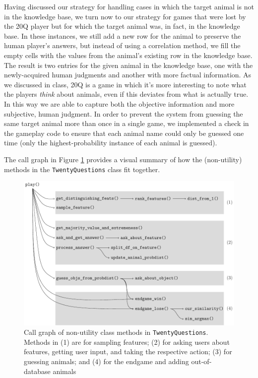 \documentclass[11pt,a4paper]{article}
\begin{document}
Having discussed our strategy for handling cases in which the target animal is not in the knowledge base, we turn now to our strategy for games that were lost by the 20Q player but for which the target animal was, in fact, in the knowledge base. 
In these instances, we still add a new row for the animal to preserve the human player's answers, but instead of using a correlation method, we fill the empty cells with the values from the animal's existing row in the knowledge base. 
The result is two entries for the given animal in the knowledge base, one with the newly-acquired human judgments and another with more factual information. 
As we discussed in class, 20Q is a game in which it's more interesting to note what the players \textit{think} about animals, even if this deviates from what is actually true. 
In this way we are able to capture both the objective information and more subjective, human judgment. 
In order to prevent the system from guessing the same target animal more than once in a single game, we implemented a check in the gameplay code to ensure that each animal name could only be guessed one time (only the highest-probability instance of each animal is guessed).  

\vspace{\baselineskip}

\noindent The call graph in Figure \ref{fig:call-graph} provides a visual summary of how the (non-utility) methods in the \texttt{TwentyQuestions} class fit together.

\begin{figure}
\centering
	\includegraphics[width=.9\linewidth]{graphics/call_graph.pdf}
	\caption{Call graph of non-utility class methods in \texttt{TwentyQuestions}. Methods in (1) are for sampling features; (2) for asking users about features, getting user input, and taking the respective action; (3) for guessing animals; and (4) for the endgame and adding out-of-database animals}
	\label{fig:call-graph}
\end{figure}
\end{document}
